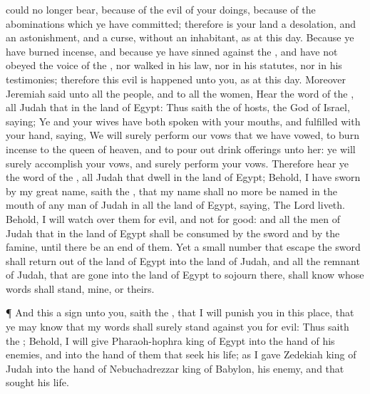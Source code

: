 {{}
could no longer
bear,
because of the
evil of your
doings,
{}
because of the
abominations which ye have
committed; therefore is your
land a
desolation, and an
astonishment, and a
curse, without an
inhabitant, as at this
day.
Because ye have burned
incense, and because ye have
sinned against the
{}, and have not
obeyed the
voice of the
{}, nor
walked in his
law, nor in his
statutes, nor in his
testimonies; therefore this
evil is
happened unto you, as at this
day.
Moreover
Jeremiah
said unto all the
people, and to all the
women,
Hear the
word of the
{}, all
Judah that
{} in the
land of
Egypt:
Thus
saith the
{} of
hosts, the
God of
Israel,
saying; Ye and your
wives have both
spoken with your
mouths, and
fulfilled with your
hand,
saying, We will
surely
perform our
vows that we have
vowed, to burn
incense to the
queen of
heaven, and to pour
out drink
offerings unto her: ye will
surely
accomplish your
vows, and
surely
perform your
vows.
Therefore
hear ye the
word of the
{}, all
Judah that
dwell in the
land of
Egypt; Behold, I have
sworn by my
great
name,
saith the
{}, that my
name shall no more be
named in the
mouth of any
man of
Judah in all the
land of
Egypt,
saying, The
Lord
{}
liveth.
Behold, I will
watch over them for
evil, and not for
good: and all the
men of
Judah that
{} in the
land of
Egypt shall be
consumed by the
sword and by the
famine, until there be an
end of them.
Yet a
small
number that
escape the
sword shall return
out of the
land of
Egypt into the
land of
Judah, and all the
remnant of
Judah, that are
gone into the
land of
Egypt to
sojourn there, shall
know whose
words shall
stand, mine, or theirs.
\par }{\PP {}¶ And this
{} a
sign unto you,
saith the
{}, that I will
punish you in this
place, that ye may
know that my
words shall
surely
stand against you for
evil:
Thus
saith the
{}; Behold, I will
give
Pharaoh-hophra
king of
Egypt into the
hand of his
enemies, and into the
hand of them that
seek his
life; as I
gave
Zedekiah
king of
Judah into the
hand of
Nebuchadrezzar
king of
Babylon, his
enemy, and that
sought his
life.

}
